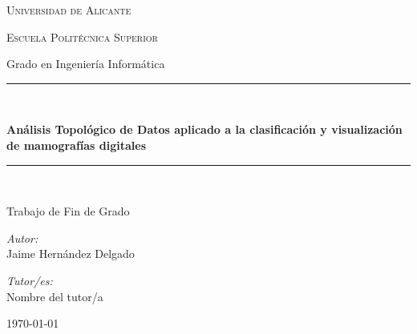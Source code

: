 \begin{titlepage}
\centering


{\scshape\LARGE Universidad de Alicante \par}
{\scshape\large Escuela Politécnica Superior \par}
\vspace{0.5cm}
{\large Grado en Ingeniería Informática \par}   %
\vspace{2cm}

\rule{\linewidth}{0.5mm}\\[0.6cm]
{\huge\bfseries Análisis Topológico de Datos aplicado a la clasificación y visualización de mamografías digitales \par}
\vspace{0.4cm}
\rule{\linewidth}{0.5mm}\\[1.5cm]

{\large Trabajo de Fin de Grado \par}
\vspace{2.5cm}

\begin{minipage}{0.45\textwidth}
\begin{flushleft}\large
\textit{Autor:}\\
Jaime Hernández Delgado
\end{flushleft}
\end{minipage}
\hfill
\begin{minipage}{0.45\textwidth}
\begin{flushright}\large
\textit{Tutor/es:}\\
Nombre del tutor/a
\end{flushright}
\end{minipage}

\vfill
{\large \today \par}

\end{titlepage}
